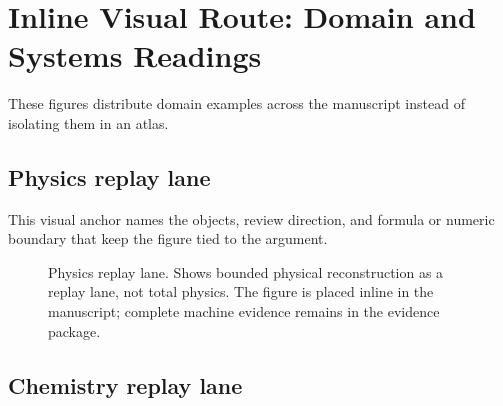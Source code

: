 \section{Inline Visual Route: Domain and Systems Readings}

These figures distribute domain examples across the manuscript instead of isolating them in an atlas.


\subsection{Physics replay lane}

This visual anchor names the objects, review direction, and formula or numeric boundary that keep the figure tied to the argument.


\begin{figure}[htbp]

\centering


\caption{Physics replay lane. Shows bounded physical reconstruction as a replay lane, not total physics. The figure is placed inline in the manuscript; complete machine evidence remains in the evidence package.}

\label{fig:r005-inline-28d_oc133_inline_figures_domain_route-1}

\end{figure}

\subsection{Chemistry replay lane}

